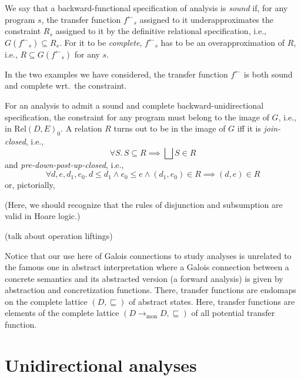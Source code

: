 \documentclass{llncs}
\newcommand{\Rel}{\mathrm{Rel}}
\newcommand{\tomon}{\to_{\mathrm{mon}}}
\newcommand{\fb}{{f^{\leftarrow}}}
\newcommand{\bigjoin}{\bigsqcup}
\newcommand{\rotleq}{\rotatebox[origin=c]{90}{$\leq$}}
\newcommand{\sqleq}{\sqsubseteq}
\begin{document}
We say that a backward-functional specification of analysis is
\emph{sound} if, for any program $s$, the transfer function $\fb_s$
assigned to it underapproximates the constraint $R_s$ assigned to it
by the definitive relational specification, i.e.,
$G(\fb_s) \subseteq R_s$.  For it to be \emph{complete}, $\fb_s$ has
to be an overapproximation of $R$, i.e., $R \subseteq G(\fb_s)$ for
any $s$.

In the two examples we have considered, the transfer function
$\fb$ is both sound and complete wrt.\ the constraint.

For an analysis to admit a sound and complete backward-unidirectional
specification, the constraint for any program must belong to the image
of $G$, i.e., in $\Rel(D,E)_0$.  A relation $R$ turns out to be in the
image of $G$ iff it is \emph{join-closed}, i.e.,
\[
\forall S.\,  S \subseteq R \implies \bigjoin S \in R
\]  
and \emph{pre-down-post-up-closed}, i.e.,
\[
\forall d, e,d_{1 },e_{0}.\, d \leq d_{1} \land e_{0} \leq e \land
(d_{1}, e_{0}) \in R \implies (d, e) \in R
\]
or, pictorially,
\begin{center}
\end{center}

(Here, we should recognize that the rules of disjunction and
subsumption are valid in Hoare logic.)

(talk about operation liftings)





Notice that our use here of Galois connections to study analyses is
unrelated to the famous one in abstract interpretation where a Galois
connection between a concrete semantics and its abstracted version (a
forward analysis) is given by abstraction and concretization
functions. There, transfer functions are endomaps on the complete
lattice $(D, \sqleq)$ of abstract states. Here, transfer functions are
elements of the complete lattice $(D \tomon D, \sqleq)$ of all
potential transfer function.


\section{Unidirectional analyses}
\end{document}
